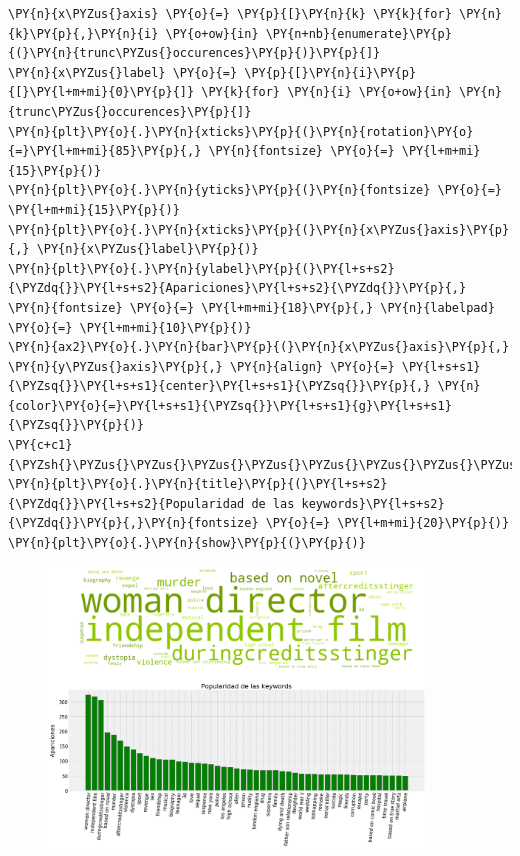 \begin{tcolorbox}[breakable, size=fbox, boxrule=1pt, pad at break*=1mm,colback=cellbackground, colframe=cellborder]
\begin{Verbatim}[commandchars=\\\{\}]
\PY{n}{x\PYZus{}axis} \PY{o}{=} \PY{p}{[}\PY{n}{k} \PY{k}{for} \PY{n}{k}\PY{p}{,}\PY{n}{i} \PY{o+ow}{in} \PY{n+nb}{enumerate}\PY{p}{(}\PY{n}{trunc\PYZus{}occurences}\PY{p}{)}\PY{p}{]}
\PY{n}{x\PYZus{}label} \PY{o}{=} \PY{p}{[}\PY{n}{i}\PY{p}{[}\PY{l+m+mi}{0}\PY{p}{]} \PY{k}{for} \PY{n}{i} \PY{o+ow}{in} \PY{n}{trunc\PYZus{}occurences}\PY{p}{]}
\PY{n}{plt}\PY{o}{.}\PY{n}{xticks}\PY{p}{(}\PY{n}{rotation}\PY{o}{=}\PY{l+m+mi}{85}\PY{p}{,} \PY{n}{fontsize} \PY{o}{=} \PY{l+m+mi}{15}\PY{p}{)}
\PY{n}{plt}\PY{o}{.}\PY{n}{yticks}\PY{p}{(}\PY{n}{fontsize} \PY{o}{=} \PY{l+m+mi}{15}\PY{p}{)}
\PY{n}{plt}\PY{o}{.}\PY{n}{xticks}\PY{p}{(}\PY{n}{x\PYZus{}axis}\PY{p}{,} \PY{n}{x\PYZus{}label}\PY{p}{)}
\PY{n}{plt}\PY{o}{.}\PY{n}{ylabel}\PY{p}{(}\PY{l+s+s2}{\PYZdq{}}\PY{l+s+s2}{Apariciones}\PY{l+s+s2}{\PYZdq{}}\PY{p}{,} \PY{n}{fontsize} \PY{o}{=} \PY{l+m+mi}{18}\PY{p}{,} \PY{n}{labelpad} \PY{o}{=} \PY{l+m+mi}{10}\PY{p}{)}
\PY{n}{ax2}\PY{o}{.}\PY{n}{bar}\PY{p}{(}\PY{n}{x\PYZus{}axis}\PY{p}{,} \PY{n}{y\PYZus{}axis}\PY{p}{,} \PY{n}{align} \PY{o}{=} \PY{l+s+s1}{\PYZsq{}}\PY{l+s+s1}{center}\PY{l+s+s1}{\PYZsq{}}\PY{p}{,} \PY{n}{color}\PY{o}{=}\PY{l+s+s1}{\PYZsq{}}\PY{l+s+s1}{g}\PY{l+s+s1}{\PYZsq{}}\PY{p}{)}
\PY{c+c1}{\PYZsh{}\PYZus{}\PYZus{}\PYZus{}\PYZus{}\PYZus{}\PYZus{}\PYZus{}\PYZus{}\PYZus{}\PYZus{}\PYZus{}\PYZus{}\PYZus{}\PYZus{}\PYZus{}\PYZus{}\PYZus{}\PYZus{}\PYZus{}\PYZus{}\PYZus{}\PYZus{}\PYZus{}}
\PY{n}{plt}\PY{o}{.}\PY{n}{title}\PY{p}{(}\PY{l+s+s2}{\PYZdq{}}\PY{l+s+s2}{Popularidad de las keywords}\PY{l+s+s2}{\PYZdq{}}\PY{p}{,}\PY{n}{fontsize} \PY{o}{=} \PY{l+m+mi}{20}\PY{p}{)}
\PY{n}{plt}\PY{o}{.}\PY{n}{show}\PY{p}{(}\PY{p}{)}
\end{Verbatim}
\end{tcolorbox}

\begin{figure}[h]
    \centering
    \captionsetup{width=10cm}
    \includegraphics[width=10cm]{./contenido/imagenes/output_18_0.png}

\end{figure}
    { \hspace*{\fill} \\}
    
